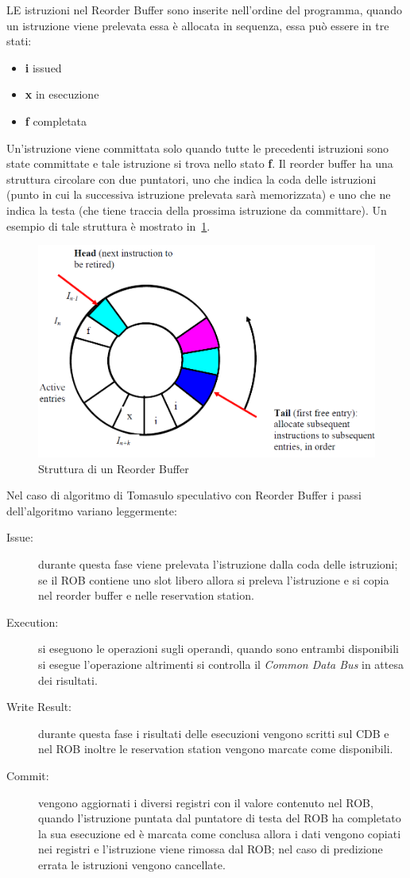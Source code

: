 LE istruzioni nel Reorder Buffer sono inserite nell'ordine del programma, quando un istruzione viene prelevata essa è allocata in sequenza, essa può essere in tre stati:
\begin{itemize}
\item \textbf{i} issued
\item \textbf{x} in esecuzione
\item \textbf{f} completata
\end{itemize}
Un'istruzione viene committata solo quando tutte le precedenti istruzioni sono state committate e tale istruzione si trova nello stato \textbf{f}.
Il reorder buffer ha una struttura circolare con due puntatori, uno che indica la coda delle istruzioni (punto in cui la successiva istruzione prelevata sarà memorizzata) e uno che ne indica la testa (che tiene traccia della prossima istruzione da committare). Un esempio di tale struttura è mostrato in \figurename\,\ref{fig:reorderbuff}.
\begin{figure}[htb]
\centering
\includegraphics[scale=0.5]{img/reorderbuff.png}
\caption{Struttura di un Reorder Buffer}\label{fig:reorderbuff}
\end{figure}
Nel caso di algoritmo di Tomasulo speculativo con Reorder Buffer i passi dell'algoritmo variano leggermente:
\begin{description}
\item[Issue:] durante questa fase viene prelevata l'istruzione dalla coda delle istruzioni; se il ROB contiene uno slot libero allora si preleva l'istruzione e si copia nel reorder buffer e nelle reservation station.
\item[Execution:] si eseguono le operazioni sugli operandi, quando sono entrambi disponibili si esegue l'operazione altrimenti si controlla il \emph{Common Data Bus} in attesa dei risultati.
\item[Write Result:] durante questa fase i risultati delle esecuzioni vengono scritti sul CDB e nel ROB inoltre le reservation station vengono marcate come disponibili.
\item[Commit:] vengono aggiornati i diversi registri con il valore contenuto nel ROB, quando l'istruzione puntata dal puntatore di testa del ROB ha completato la sua esecuzione ed è marcata come conclusa allora i dati vengono  copiati nei registri e l'istruzione viene rimossa dal ROB; nel caso di predizione errata le istruzioni vengono cancellate.
\end{description}
